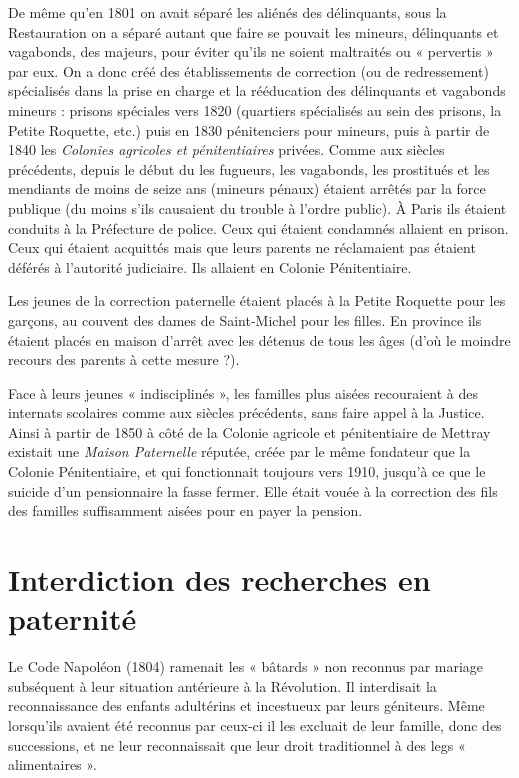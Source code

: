  De même qu'en 1801 on avait séparé les aliénés des délinquants, sous la Restauration on a séparé autant que faire se pouvait les mineurs, délinquants et vagabonds, des majeurs, pour éviter qu'ils ne soient maltraités ou « pervertis » par eux. On a donc créé des établissements de correction (ou de redressement) spécialisés dans la prise en charge et la rééducation des délinquants et vagabonds mineurs : prisons spéciales vers 1820 (quartiers spécialisés au sein des prisons, la Petite Roquette, etc.) puis en 1830 pénitenciers pour mineurs, puis à partir de 1840 les \emph{Colonies agricoles et pénitentiaires} privées. Comme aux siècles précédents, depuis le début du  les fugueurs, les vagabonds, les prostitués et les mendiants de moins de seize ans (mineurs pénaux) étaient arrêtés par la force publique (du moins s'ils causaient du trouble à l'ordre public). À Paris ils étaient conduits à la Préfecture de police. Ceux qui étaient condamnés allaient en prison. Ceux qui étaient acquittés mais que leurs parents ne réclamaient pas étaient déférés à l'autorité judiciaire. Ils allaient en Colonie Pénitentiaire.

 Les jeunes de la correction paternelle étaient placés à la Petite Roquette pour les garçons, au couvent des dames de Saint-Michel pour les filles. En province ils étaient placés en maison d'arrêt avec les détenus de tous les âges (d'où le moindre recours des parents à cette mesure ?). 

 Face à leurs jeunes « indisciplinés », les familles plus aisées recouraient à des internats scolaires comme aux siècles précédents, sans faire appel à la Justice. Ainsi à partir de 1850 à côté de la Colonie agricole et pénitentiaire de Mettray existait une \emph{Maison Paternelle} réputée, créée par le même fondateur que la Colonie Pénitentiaire, et qui fonctionnait toujours vers 1910, jusqu'à ce que le suicide d'un pensionnaire la fasse fermer. Elle était vouée à la correction des fils des familles suffisamment aisées pour en payer la pension.

\section{Interdiction des recherches en paternité}

 Le Code Napoléon (1804) ramenait les « bâtards » non reconnus par mariage subséquent à leur situation antérieure à la Révolution. Il interdisait la reconnaissance des enfants adultérins et incestueux par leurs géniteurs. Même lorsqu'ils avaient été reconnus par ceux-ci il les excluait de leur famille, donc des successions, et ne leur reconnaissait que leur droit traditionnel à des legs « alimentaires ». 

